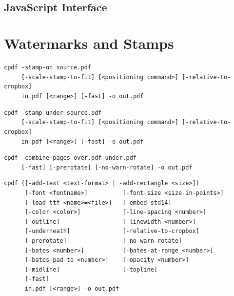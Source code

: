 \documentclass{book}
\begin{document}
\begin{jscpdflib}
\clearpage
\section*{JavaScript Interface}
\begin{small}\tt

\end{small}
\end{jscpdflib}

\chapter{Watermarks and Stamps}\label{chap:8}
\label{stamps}
  \begin{framed}
  \noindent\small\verb!cpdf -stamp-on source.pdf!\\
  \noindent\small\verb!     [-scale-stamp-to-fit] [<positioning command>] [-relative-to-cropbox] !\\
  \noindent\small\verb!     in.pdf [<range>] [-fast] -o out.pdf!
  
  \vspace{1.5mm}
  \noindent\small\verb!cpdf -stamp-under source.pdf!\\
  \noindent\small\verb!     [-scale-stamp-to-fit] [<positioning command>] [-relative-to-cropbox]!\\
  \noindent\small\verb!     in.pdf [<range>] [-fast] -o out.pdf!

  \vspace{1.5mm}
  \noindent\small\verb!cpdf -combine-pages over.pdf under.pdf!\\
  \noindent\small\verb!     [-fast] [-prerotate] [-no-warn-rotate] -o out.pdf!

  \vspace{1.5mm}
  \noindent\small\begin{verbatim}cpdf ([-add-text <text-format> | -add-rectangle <size>])
      [-font <fontname>]          [-font-size <size-in-points>]
      [-load-ttf <name>=<file>]   [-embed-std14]
      [-color <color>]            [-line-spacing <number>]
      [-outline]                  [-linewidth <number>]
      [-underneath]               [-relative-to-cropbox]
      [-prerotate]                [-no-warn-rotate]
      [-bates <number>]           [-bates-at-range <number>]
      [-bates-pad-to <number>]    [-opacity <number>]
      [-midline]                  [-topline]
      [-fast]
      in.pdf [<range>] -o out.pdf\end{verbatim}


\end{framed}
\end{document}
